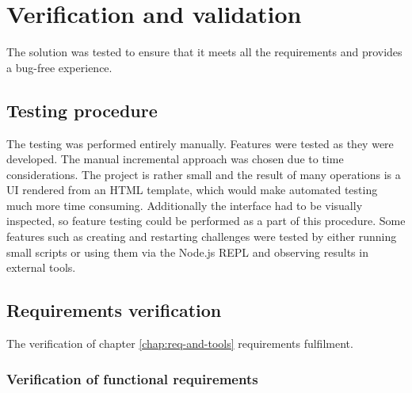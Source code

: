 \chapter{Verification and validation}

The solution was tested to ensure that it meets all the requirements and provides a bug-free experience.

\section{Testing procedure}

The testing was performed entirely manually. Features were tested as they were developed. The manual incremental approach was chosen due to time considerations. The project is rather small and the result of many operations is a UI rendered from an HTML template, which would make automated testing much more time consuming. Additionally the interface had to be visually inspected, so feature testing could be performed as a part of this procedure. Some features such as creating and restarting challenges were tested by either running small scripts or using them via the Node.js REPL and observing results in external tools.

\section{Requirements verification}

The verification of chapter \ref{chap:req-and-tools} requirements fulfilment.

\subsection{Verification of functional requirements}

